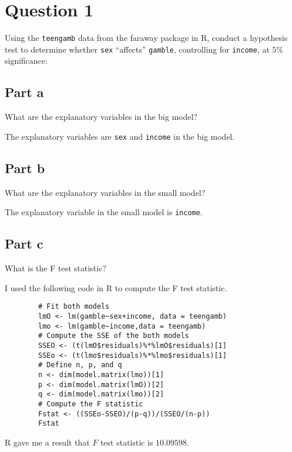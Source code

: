\section{Question 1}

\begin{question}
    Using the \verb+teengamb+ data from the faraway package in R, conduct a hypothesis test to determine whether \verb+sex+ “affects” \verb+gamble+, controlling for \verb+income+, at $5\%$ significance:
\end{question}

\subsection{Part a}

\begin{question}
    What are the explanatory variables in the big model?
\end{question}

\begin{answer}
    The explanatory variables are \verb+sex+ and \verb+income+ in the big model.
\end{answer}

\subsection{Part b}

\begin{question}
    What are the explanatory variables in the small model?
\end{question}

\begin{answer}
    The explanatory variable in the small model is \verb+income+.
\end{answer}

\subsection{Part c}

\begin{question}
    What is the F test statistic?
\end{question}

\begin{answer}
    I used the following code in R to compute the F test statistic.
    \begin{verbatim}
        # Fit both models
        lmO <- lm(gamble~sex+income, data = teengamb)
        lmo <- lm(gamble~income,data = teengamb)
        # Compute the SSE of the both models
        SSEO <- (t(lmO$residuals)%*%lmO$residuals)[1]
        SSEo <- (t(lmo$residuals)%*%lmo$residuals)[1]
        # Define n, p, and q
        n <- dim(model.matrix(lmo))[1]
        p <- dim(model.matrix(lmO))[2]
        q <- dim(model.matrix(lmo))[2]
        # Compute the F statistic
        Fstat <- ((SSEo-SSEO)/(p-q))/(SSEO/(n-p))
        Fstat
    \end{verbatim}
    R gave me a result that $F$ test statistic is $10.09598$.
\end{answer}

